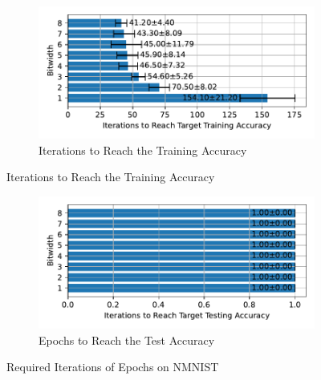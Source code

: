     \label{appendix:iterations_nmnist}
        \begin{figure}[H]
            \centering
            \begin{subfigure}[H]{0.6\textwidth}
                \centering
                \includegraphics[width=\textwidth]{../standard/NMNIST/plots/nmnist_train_iters_horizontal.pdf}
                \caption{Iterations to Reach the Training Accuracy}
            \end{subfigure}
        \end{figure}
        \begin{figure}[H]
            \centering
            \ContinuedFloat
            \begin{subfigure}[H]{0.6\textwidth}
                \centering
                \includegraphics[width=\textwidth]{../standard/NMNIST/plots/nmnist_test_iters_horizontal.pdf}
                \caption{Epochs to Reach the Test Accuracy}
            \end{subfigure}
            \caption{Required Iterations of Epochs on NMNIST}
        \end{figure}


